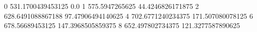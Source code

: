 0 531.1700439453125 0.0
1 575.5947265625 44.4246826171875
2 628.6491088867188 97.47906494140625
4 702.6771240234375 171.507080078125
6 678.56689453125 147.3968505859375
8 652.497802734375 121.3277587890625
